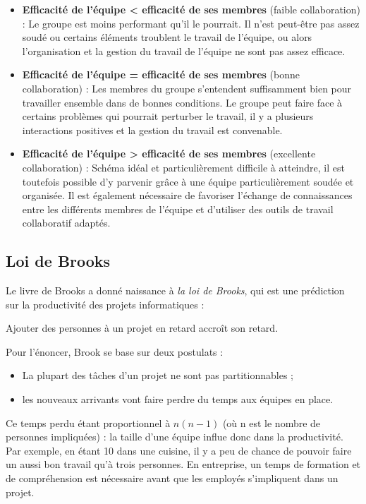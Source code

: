 \begin{itemize}

\item \textbf{Efficacité de l'équipe \textless \: efficacité de ses membres} (faible collaboration) :
Le groupe est moins performant qu'il le pourrait. Il n'est peut-être pas assez soudé ou certains éléments troublent le travail de l'équipe, ou alors l'organisation et la gestion du travail de l'équipe ne sont pas assez efficace.

\item \textbf{Efficacité de l'équipe = efficacité de ses membres} (bonne collaboration) :
Les membres du groupe s'entendent suffisamment bien pour travailler ensemble dans de bonnes conditions. Le groupe peut faire face à certains problèmes qui pourrait perturber le travail, il y a plusieurs interactions positives et la gestion du travail est convenable.

\item \textbf{Efficacité de l'équipe \textgreater \: efficacité de ses membres} (excellente collaboration) :
Schéma idéal et particulièrement difficile à atteindre, il est toutefois possible d'y parvenir grâce à une équipe particulièrement soudée et organisée. Il est également nécessaire de favoriser l'échange de connaissances entre les différents membres de l'équipe et d'utiliser des outils de travail collaboratif adaptés.

\end{itemize}

\subsection{Loi de Brooks}
Le livre de Brooks a donné naissance à \textit{la loi de Brooks}, qui est une prédiction sur la productivité des projets informatiques :

\begin{Quote}
Ajouter des personnes à un projet en retard accroît son retard.
\end{Quote}

Pour l'énoncer, Brook se base sur deux postulats :
\begin{itemize}
\item La plupart des tâches d'un projet ne sont pas partitionnables ;
\item les nouveaux arrivants vont faire perdre du temps aux équipes en place.
\end{itemize}

Ce temps perdu étant proportionnel à $ n(n-1) $ (où n est le nombre de personnes impliquées) : la taille d'une équipe influe donc dans la productivité. Par exemple, en étant 10 dans une cuisine, il y a peu de chance de pouvoir faire un aussi bon travail qu'à trois personnes. En entreprise, un temps de formation et de compréhension est nécessaire avant que les employés s'impliquent dans un projet.

